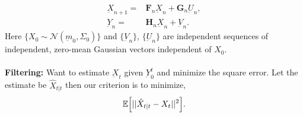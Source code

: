 \documentclass[a4paper,english,12pt]{article}
\begin{document}
\begin{align}
   \underbar{X}_{n+1}=&\textbf{F}_n\underbar{X}_n+\textbf{G}_n\underbar{U}_n,\\
   \underbar{Y}_n=&\textbf{H}_n\underbar{X}_n+\underbar{V}_n.
\end{align}
Here $\{X_0\sim\mathcal{N}(\underbar{m}_0,\Sigma_0)\}$ and $\{\underbar{V}_n\}$, $\{\underbar{U}_n\}$ are independent sequences of independent, zero-mean Gaussian vectors  independent of $X_0$.\\
\\\textbf{Filtering:}
Want to estimate $\underbar{X}_t$ given $\underbar{Y}_0^t$ and minimize the square error. Let the estimate be $\hat{X}_{t|t}$ then our criterion is to minimize,
\begin{equation}
    \mathbb{E}\Big[||\hat{X}_{t|t}-X_t||^2\Big].
\end{equation}
\end{document}
